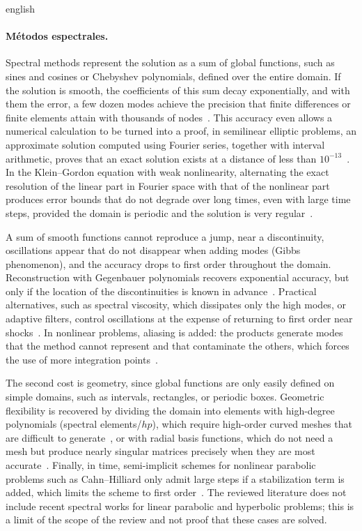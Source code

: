 \documentclass[0000.tex]{subfiles}
\begin{document}
\begin{hyphenrules}{english}
\paragraph{Métodos espectrales.}
Spectral methods represent the solution as a sum of global functions, such as sines and cosines or Chebyshev polynomials, defined over the entire domain. 
If the solution is smooth, the coefficients of this sum decay exponentially, and with them the error, a few dozen modes achieve the precision that finite 
differences or finite elements attain with thousands of nodes~\cite{xu2018spectral}. This accuracy even allows a numerical calculation to be turned into a 
proof, in semilinear elliptic problems, an approximate solution computed using Fourier series, together with interval arithmetic, proves that an exact solution 
exists at a distance of less than $10^{-13}$~\cite{cadiot2024rigorous}. In the Klein–Gordon equation with weak nonlinearity, alternating the exact resolution of 
the linear part in Fourier space with that of the nonlinear part produces error bounds that do not degrade over long times, even with large time steps, 
provided the domain is periodic and the solution is very regular~\cite{bao2022uniform}.

A sum of smooth functions cannot reproduce a jump, near a discontinuity, oscillations appear that do not disappear when adding modes (Gibbs phenomenon), and 
the accuracy drops to first order throughout the domain. Reconstruction with Gegenbauer polynomials recovers exponential accuracy, but only if the location of 
the discontinuities is known in advance~\cite{gottlieb1997gibbs}. Practical alternatives, such as spectral viscosity, which dissipates only the high modes, or 
adaptive filters, control oscillations at the expense of returning to first order near shocks~\cite{tadmor2012review,dzanic2022positivity}. In nonlinear problems, 
aliasing is added: the products generate modes that the method cannot represent and that contaminate the others, which forces the use of more integration 
points~\cite{xu2018spectral}.

The second cost is geometry, since global functions are only easily defined on simple domains, such as intervals, rectangles, or periodic boxes. Geometric 
flexibility is recovered by dividing the domain into elements with high-degree polynomials (spectral elements/$hp$), which require high-order curved meshes 
that are difficult to generate~\cite{xu2018spectral}, or with radial basis functions, which do not need a mesh but produce nearly singular matrices precisely when 
they are most accurate~\cite{fornberg2015solving}. Finally, in time, semi-implicit schemes for nonlinear parabolic problems such as Cahn–Hilliard only admit large 
steps if a stabilization term is added, which limits the scheme to first order~\cite{li2022large}. The reviewed literature does not include recent spectral works 
for linear parabolic and hyperbolic problems; this is a limit of the scope of the review and not proof that these cases are solved.


\end{hyphenrules}
\end{document}
